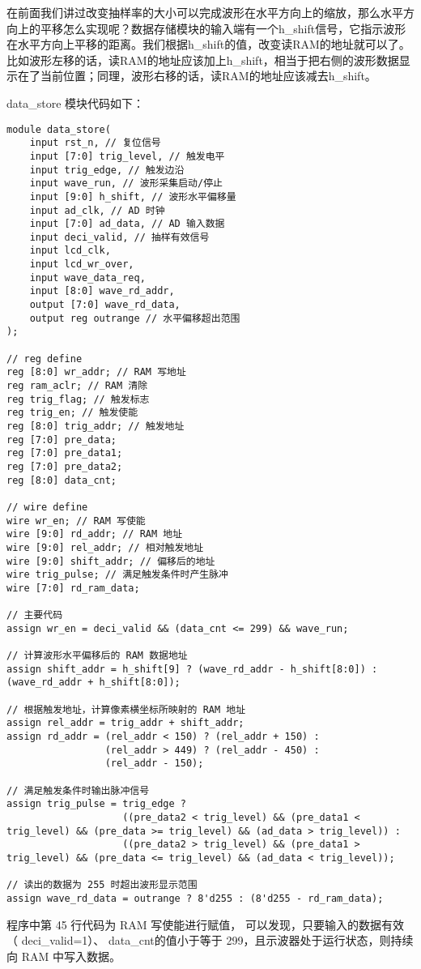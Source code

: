\documentclass[lang=cn,a4paper,newtx]{elegantpaper}
\begin{document}
在前面我们讲过改变抽样率的大小可以完成波形在水平方向上的缩放，那么水平方向上的平移怎么实现呢？数据存储模块的输入端有一个h\_shift信号，它指示波形在水平方向上平移的距离。我们根据h\_shift的值，改变读RAM的地址就可以了。比如波形左移的话，读RAM的地址应该加上h\_shift，相当于把右侧的波形数据显示在了当前位置；同理，波形右移的话，读RAM的地址应该减去h\_shift。

data\_store 模块代码如下：
\begin{lstlisting}
module data_store(
    input rst_n, // 复位信号
    input [7:0] trig_level, // 触发电平
    input trig_edge, // 触发边沿
    input wave_run, // 波形采集启动/停止
    input [9:0] h_shift, // 波形水平偏移量
    input ad_clk, // AD 时钟
    input [7:0] ad_data, // AD 输入数据
    input deci_valid, // 抽样有效信号
    input lcd_clk,
    input lcd_wr_over,
    input wave_data_req,
    input [8:0] wave_rd_addr,
    output [7:0] wave_rd_data,
    output reg outrange // 水平偏移超出范围
);

// reg define
reg [8:0] wr_addr; // RAM 写地址
reg ram_aclr; // RAM 清除
reg trig_flag; // 触发标志
reg trig_en; // 触发使能
reg [8:0] trig_addr; // 触发地址
reg [7:0] pre_data;
reg [7:0] pre_data1;
reg [7:0] pre_data2;
reg [8:0] data_cnt;

// wire define
wire wr_en; // RAM 写使能
wire [9:0] rd_addr; // RAM 地址
wire [9:0] rel_addr; // 相对触发地址
wire [9:0] shift_addr; // 偏移后的地址
wire trig_pulse; // 满足触发条件时产生脉冲
wire [7:0] rd_ram_data;

// 主要代码
assign wr_en = deci_valid && (data_cnt <= 299) && wave_run;

// 计算波形水平偏移后的 RAM 数据地址
assign shift_addr = h_shift[9] ? (wave_rd_addr - h_shift[8:0]) : (wave_rd_addr + h_shift[8:0]);

// 根据触发地址，计算像素横坐标所映射的 RAM 地址
assign rel_addr = trig_addr + shift_addr;
assign rd_addr = (rel_addr < 150) ? (rel_addr + 150) :
                 (rel_addr > 449) ? (rel_addr - 450) :
                 (rel_addr - 150);

// 满足触发条件时输出脉冲信号
assign trig_pulse = trig_edge ?
                    ((pre_data2 < trig_level) && (pre_data1 < trig_level) && (pre_data >= trig_level) && (ad_data > trig_level)) :
                    ((pre_data2 > trig_level) && (pre_data1 > trig_level) && (pre_data <= trig_level) && (ad_data < trig_level));

// 读出的数据为 255 时超出波形显示范围
assign wave_rd_data = outrange ? 8'd255 : (8'd255 - rd_ram_data);

\end{lstlisting}
程序中第 45 行代码为 RAM 写使能进行赋值， 可以发现，只要输入的数据有效（ deci\_valid=1）、 data\_cnt的值小于等于 299，且示波器处于运行状态，则持续向 RAM 中写入数据。
\end{document}
